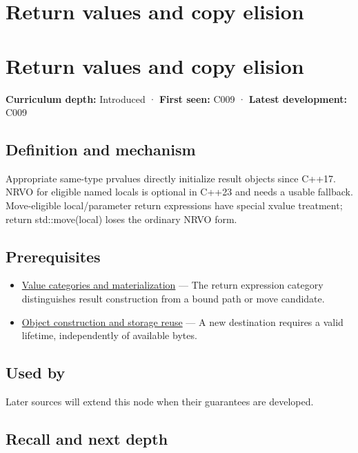 \hypertarget{appendix-b08d3788c5c6}{}
\section*{Return values and copy elision}
\section{Return values and copy elision}\label{return-values-and-copy-elision}

\textbf{Curriculum depth:} Introduced · \textbf{First seen:} C009 · \textbf{Latest development:} C009

\subsection{Definition and mechanism}\label{definition-and-mechanism}

Appropriate same-type prvalues directly initialize result objects since C++17. NRVO for eligible named locals is optional in C++23 and needs a usable fallback. Move-eligible local/parameter return expressions have special xvalue treatment; return std::move(local) loses the ordinary NRVO form.

\subsection{Prerequisites}\label{prerequisites}

\begin{itemize}
\tightlist
\item
  \hyperref[appendix-1121b30eaeb0]{Value categories and materialization} --- The return expression category distinguishes result construction from a bound path or move candidate.
\item
  \hyperref[appendix-a82f9c438857]{Object construction and storage reuse} --- A new destination requires a valid lifetime, independently of available bytes.
\end{itemize}

\subsection{Used by}\label{used-by}

Later sources will extend this node when their guarantees are developed.

\subsection{Recall and next depth}\label{recall-and-next-depth}


